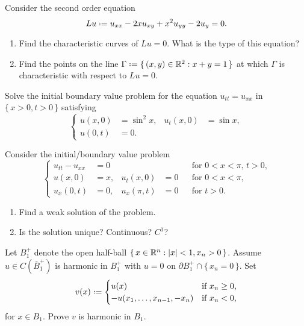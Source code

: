 \begin{problem}
  Consider the second order equation
  \[
    Lu\defeq u_{xx}-2xu_{xy}+x^2u_{yy}-2u_y=0.
  \]
  \begin{enumerate}[label=(\alph*),noitemsep]
  \item Find the characteristic curves of \(Lu=0\). What is the type of
    this equation?
  \item Find the points on the line
    \(\Gamma\defeq\{\,(x,y)\in\bbR^2:x+y=1\,\}\) at which \(\Gamma\) is
    characteristic with respect to \(Lu=0\).
  \end{enumerate}
\end{problem}
\begin{solution*}
\end{solution*}

\begin{problem}
  Solve the initial boundary value problem for the equation
  \(u_{tt}=u_{xx}\) in \(\{\,x>0,t>0\,\}\) satisfying
    \[
     \left\{
       \begin{aligned}
         u(x,0)&=\sin^2x,&u_t(x,0)&=\sin x,\\
         u(0,t)&=0.
      \end{aligned}
    \right.
  \]
\end{problem}
\begin{solution*}
\end{solution*}

\begin{problem}
  Consider the initial/boundary value problem
    \[
     \left\{
       \begin{aligned}
         u_{tt}-u_{xx}&=0&&&&\text{for \(0<x<\pi\), \(t>0\),}\\
         u(x,0)&=x,&u_t(x,0)&=0&&\text{for \(0<x<\pi\),}\\
         u_x(0,t)&=0,&u_x(\pi,t)&=0&&\text{for \(t>0\).}
      \end{aligned}
    \right.
  \]
  \begin{enumerate}[label=(\alph*),noitemsep]
  \item Find a weak solution of the problem.
  \item Is the solution unique? Continuous? \(C^1\)?
  \end{enumerate}
\end{problem}
\begin{solution*}
\end{solution*}

\begin{problem}
  Let \(B_1^+\) denote the open half-ball
  \(\{\,x\in\mathbb{R}^n:|x|<1,x_n>0\,\}\). Assume \(u\in C(\bar B_1^+)\) is
  harmonic in \(B_1^+\) with \(u=0\) on \(\partial
  B_1^+\cap\{\,x_n=0\,\}\). Set
  \[
    v(x)\defeq
    \begin{cases}
      u(x)&\text{if \(x_n\geq 0\),}\\
      -u(x_1,\dotsc,x_{n-1},-x_n)&\text{if \(x_n<0\),}
    \end{cases}
  \]
  for \(x\in B_1\). Prove \(v\) is harmonic in \(B_1\).
\end{problem}
\begin{solution*}
\end{solution*}

